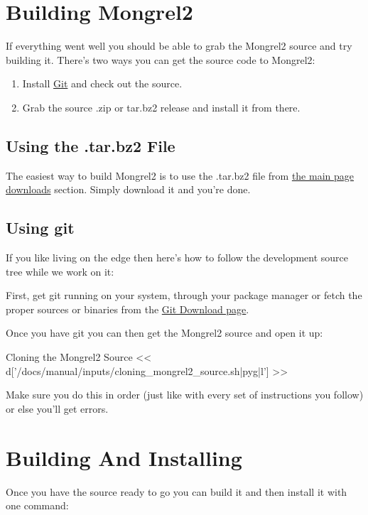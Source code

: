 \section{Building Mongrel2}

If everything went well you should be able to grab the Mongrel2 source
and try building it.  There's two ways you can get the source code to
Mongrel2:

\begin{enumerate}
\item Install \href{http://git-scm.org}{Git} and check out the source.
\item Grab the source .zip or tar.bz2 release and install it from there.
\end{enumerate}

\subsection{Using the .tar.bz2 File}

The easiest way to build Mongrel2 is to use the .tar.bz2 file from 
\href{http://mongrel2.org/home#download}{the main page downloads} section.
Simply download it and you're done.


\subsection{Using git}

If you like living on the edge then here's how to follow the development source
tree while we work on it:

First, get git running on your system, through your package manager or fetch
the proper sources or binaries from the \href{http://git-scm.com/download}{Git Download page}.

Once you have git you can then get the Mongrel2 source and open it up:

\begin{code}{Cloning the Mongrel2 Source}
<< d['/docs/manual/inputs/cloning_mongrel2_source.sh|pyg|l'] >>
\end{code}

Make sure you do this in order (just like with every set of instructions you follow)
or else you'll get errors.


\section{Building And Installing}

Once you have the source ready to go you can build it and then install it with
one command:  

